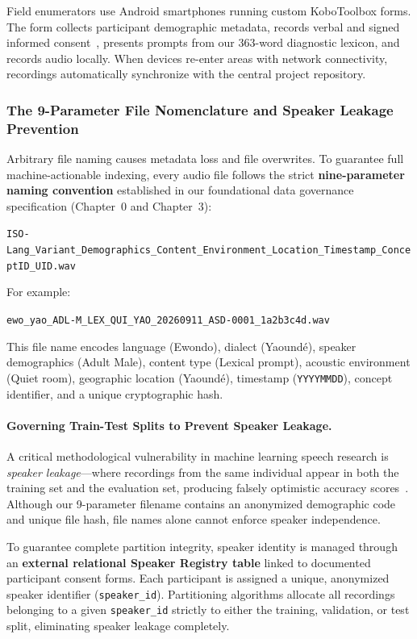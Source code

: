 \documentclass[a4paper,11pt]{article}
\begin{document}
Field enumerators use Android smartphones running custom KoboToolbox forms. The form collects participant demographic metadata, records verbal and signed informed consent~\cite{gebru2021datasheets, grenoble2010language}, presents prompts from our 363-word diagnostic lexicon, and records audio locally. When devices re-enter areas with network connectivity, recordings automatically synchronize with the central project repository.

\subsubsection{The 9-Parameter File Nomenclature and Speaker Leakage Prevention}
\label{sec:chap2_naming_rule}
Arbitrary file naming causes metadata loss and file overwrites. To guarantee full machine-actionable indexing, every audio file follows the strict \textbf{nine-parameter naming convention} established in our foundational data governance specification (Chapter~0 and Chapter~3):
\begin{center}
\texttt{ISO-Lang\_Variant\_Demographics\_Content\_Environment\_Location\_Timestamp\_ConceptID\_UID.wav}
\end{center}
For example:
\begin{center}
\texttt{ewo\_yao\_ADL-M\_LEX\_QUI\_YAO\_20260911\_ASD-0001\_1a2b3c4d.wav}
\end{center}
This file name encodes language (Ewondo), dialect (Yaound\'e), speaker demographics (Adult Male), content type (Lexical prompt), acoustic environment (Quiet room), geographic location (Yaound\'e), timestamp (\texttt{YYYYMMDD}), concept identifier, and a unique cryptographic hash.

\paragraph{Governing Train-Test Splits to Prevent Speaker Leakage.}
A critical methodological vulnerability in machine learning speech research is \textit{speaker leakage}---where recordings from the same individual appear in both the training set and the evaluation set, producing falsely optimistic accuracy scores~\cite{gauthier2016collecting}. Although our 9-parameter filename contains an anonymized demographic code and unique file hash, file names alone cannot enforce speaker independence. 

To guarantee complete partition integrity, speaker identity is managed through an \textbf{external relational Speaker Registry table} linked to documented participant consent forms. Each participant is assigned a unique, anonymized speaker identifier (\texttt{speaker\_id}). Partitioning algorithms allocate all recordings belonging to a given \texttt{speaker\_id} strictly to either the training, validation, or test split, eliminating speaker leakage completely.
\end{document}
